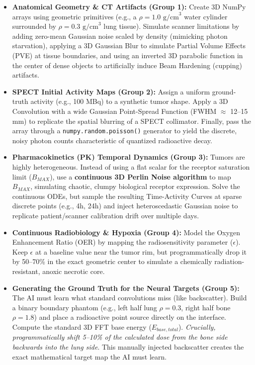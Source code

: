 \documentclass[11pt,a4paper]{article}
\begin{document}
\begin{itemize}
    \item \textbf{Anatomical Geometry \& CT Artifacts (Group 1):} Create 3D NumPy arrays using geometric primitives (e.g., a $\rho=1.0 \text{ g/cm}^3$ water cylinder surrounded by $\rho=0.3 \text{ g/cm}^3$ lung tissue). Simulate scanner limitations by adding zero-mean Gaussian noise scaled by density (mimicking photon starvation), applying a 3D Gaussian Blur to simulate Partial Volume Effects (PVE) at tissue boundaries, and using an inverted 3D parabolic function in the center of dense objects to artificially induce Beam Hardening (cupping) artifacts.
    \item \textbf{SPECT Initial Activity Maps (Group 2):} Assign a uniform ground-truth activity (e.g., 100 MBq) to a synthetic tumor shape. Apply a 3D Convolution with a wide Gaussian Point-Spread Function (FWHM $\approx$ 12--15 mm) to replicate the spatial blurring of a SPECT collimator. Finally, pass the array through a \texttt{numpy.random.poisson()} generator to yield the discrete, noisy photon counts characteristic of quantized radioactive decay.
    \item \textbf{Pharmacokinetics (PK) Temporal Dynamics (Group 3):} Tumors are highly heterogeneous. Instead of using a flat scalar for the receptor saturation limit ($B_{MAX}$), use a \textbf{continuous 3D Perlin Noise algorithm} to map $B_{MAX}$, simulating chaotic, clumpy biological receptor expression. Solve the continuous ODEs, but sample the resulting Time-Activity Curves at sparse discrete points (e.g., 4h, 24h) and inject heteroscedastic Gaussian noise to replicate patient/scanner calibration drift over multiple days.
    \item \textbf{Continuous Radiobiology \& Hypoxia (Group 4):} Model the Oxygen Enhancement Ratio (OER) by mapping the radiosensitivity parameter ($\epsilon$). Keep $\epsilon$ at a baseline value near the tumor rim, but programmatically drop it by 50--70\% in the exact geometric center to simulate a chemically radiation-resistant, anoxic necrotic core.
    \item \textbf{Generating the Ground Truth for the Neural Targets (Group 5):} The AI must learn what standard convolutions miss (like backscatter). Build a binary boundary phantom (e.g., left half lung $\rho=0.3$, right half bone $\rho=1.8$) and place a radioactive point source directly on the interface. Compute the standard 3D FFT base energy ($E_{base, total}$). \textit{Crucially, programmatically shift 5--10\% of the calculated dose from the bone side backwards into the lung side}. This manually injected backscatter creates the exact mathematical target map the AI must learn.
\end{itemize}
\end{document}
